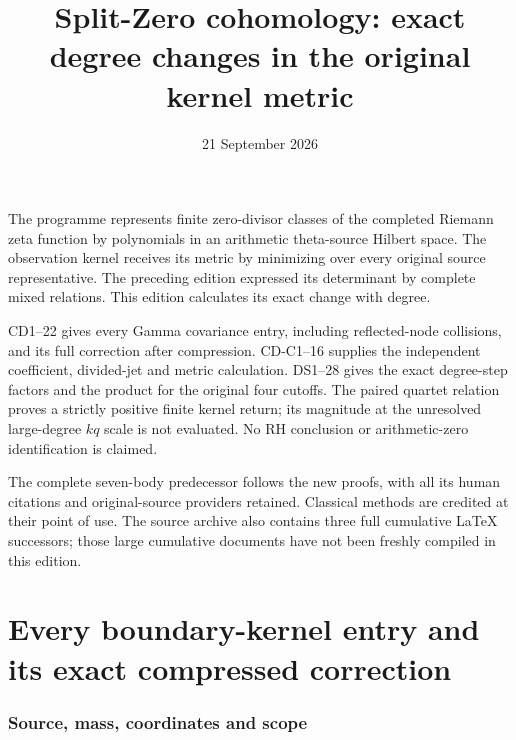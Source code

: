 \documentclass[11pt]{article}
\begin{document}
\title{Split-Zero cohomology: exact degree changes in the original kernel metric}
\author{}\date{21 September 2026}\maketitle
The programme represents finite zero-divisor classes of the completed Riemann
zeta function by polynomials in an arithmetic theta-source Hilbert space.
The observation kernel receives its metric by minimizing over every original
source representative. The preceding edition expressed its determinant by
complete mixed relations. This edition calculates its exact change with degree.

CD1--22 gives every Gamma covariance entry, including reflected-node collisions,
and its full correction after compression. CD-C1--16 supplies the independent
coefficient, divided-jet and metric calculation. DS1--28 gives the exact
degree-step factors and the product for the original four cutoffs. The paired
quartet relation proves a strictly positive finite kernel return; its magnitude
at the unresolved large-degree $kq$ scale is not evaluated. No RH conclusion
or arithmetic-zero identification is claimed.

The complete seven-body predecessor follows the new proofs, with all its
human citations and original-source providers retained. Classical methods are
credited at their point of use. The source archive also contains three full
cumulative LaTeX successors; those large cumulative documents have not been
freshly compiled in this edition.


\clearpage\begingroup
\part*{Every boundary-kernel entry and its exact compressed correction}
\newcommand{\cdrootC}{\mathbb C}
\newcommand{\cdrootR}{\mathbb R}
\newcommand{\cdrootconj}[1]{\overline{#1}}


\section{Source, mass, coordinates and scope}
\end{document}
